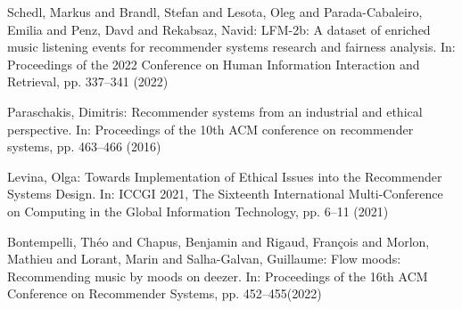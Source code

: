 \documentclass[runningheads,a4paper]{llncs}
\begin{document}
\begin{thebibliography}{4}
 Schedl, Markus and Brandl, Stefan and Lesota, Oleg and Parada-Cabaleiro, Emilia and Penz, Davd and Rekabsaz, Navid:
LFM-2b: A dataset of enriched music listening events for recommender systems research and fairness analysis. In:
Proceedings of the 2022 Conference on Human Information Interaction and Retrieval, pp. 337--341 (2022)


 Paraschakis, Dimitris:
Recommender systems from an industrial and ethical perspective. In:
Proceedings of the 10th ACM conference on recommender systems, pp.
463--466 (2016)

Levina, Olga:
Towards Implementation of Ethical Issues into the Recommender Systems Design. In:
ICCGI 2021, The Sixteenth International Multi-Conference on Computing in the Global Information Technology, 
pp. 6--11 (2021)

 Bontempelli, Th{\'e}o and Chapus, Benjamin and Rigaud, Fran{\c{c}}ois and Morlon, Mathieu and Lorant, Marin and Salha-Galvan, Guillaume:
Flow moods: Recommending music by moods on deezer. In: 
Proceedings of the 16th ACM Conference on Recommender Systems, pp. 
452--455(2022)








\end{thebibliography}
\end{document}
